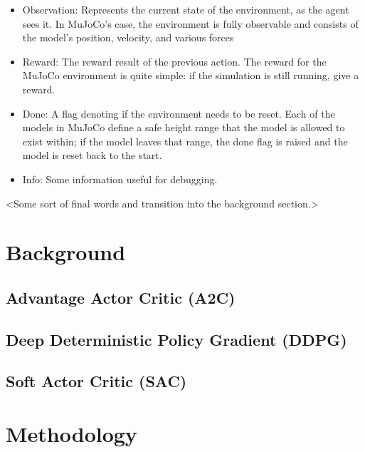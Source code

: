 \documentclass[conference]{IEEEtran}
\begin{document}
\begin{itemize}
    \item Observation: Represents the current state of the environment, as the agent sees it. In MuJoCo's case, the
    environment is fully observable and consists of the model's position, velocity, and various forces \cite{gym_source}
    \item Reward: The reward result of the previous action. The reward for the MuJoCo environment is quite simple: if
    the simulation is still running, give a reward.
    \item Done: A flag denoting if the environment needs to be reset. Each of the models in MuJoCo define a safe height
    range that the model is allowed to exist within; if the model leaves that range, the done flag is raised and the
    model is reset back to the start.
    \item Info: Some information useful for debugging.
\end{itemize}

<Some sort of final words and transition into the background section.>

\section{Background}

\blindtext

\subsection{Advantage Actor Critic (A2C)}

\blindtext

\subsection{Deep Deterministic Policy Gradient (DDPG)}

\blindtext

\subsection{Soft Actor Critic (SAC)}

\blindtext

\section{Methodology}
\end{document}
